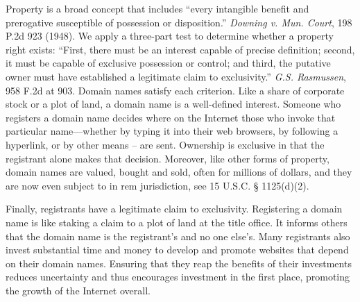 Property is a broad concept that includes ``every intangible benefit and
prerogative susceptible of possession or disposition.'' \textit{Downing v. Mun.
Court}, 198 P.2d 923 (1948). We apply a three-part test to determine whether a
property right exists: ``First, there must be an interest capable of precise
definition; second, it must be capable of exclusive possession or control; and
third, the putative owner must have established a legitimate claim to
exclusivity.'' \textit{G.S. Rasmussen}, 958 F.2d at 903. Domain names satisfy
each criterion. Like a share of corporate stock or a plot of land, a domain
name is a well-defined interest. Someone who registers a domain name decides
where on the Internet those who invoke that particular name---whether by
typing it into their web browsers, by following a hyperlink, or by other means
-- are sent. Ownership is exclusive in that the registrant alone makes that
decision. Moreover, like other forms of property, domain names are valued,
bought and sold, often for millions of dollars, and they are now even subject
to in rem jurisdiction, see 15 U.S.C. {\S} 1125(d)(2).

Finally, registrants have a legitimate claim to exclusivity. Registering a
domain name is like staking a claim to a plot of land at the title office. It
informs others that the domain name is the registrant's and no one else's. Many
registrants also invest substantial time and money to develop and promote
websites that depend on their domain names. Ensuring that they reap the
benefits of their investments reduces uncertainty and thus encourages
investment in the first place, promoting the growth of the Internet overall.

